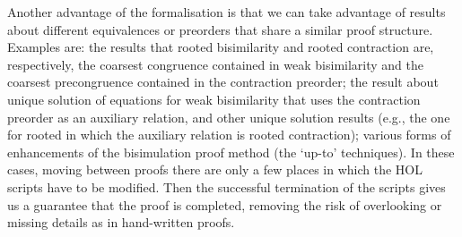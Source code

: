 
Another advantage of the formalisation is 
that we can take advantage of results about different 
equivalences or preorders that share a similar  proof structure. 
Examples are: the results that rooted bisimilarity and rooted contraction are,
respectively, the coarsest congruence contained in weak bisimilarity 
and the coarsest precongruence contained in the contraction  preorder; 
the result about unique solution of equations for weak bisimilarity that uses the
contraction preorder as an auxiliary relation, and other unique solution results (e.g., 
the one for rooted in which
the auxiliary relation is rooted contraction); various forms of enhancements of the bisimulation
proof method (the `up-to' techniques).
In these cases,  moving between proofs there are only a few places in
which the HOL scripts have to be modified.
Then the successful termination of the scripts  gives us a guarantee that the proof is
completed,  removing the risk 
of overlooking or missing details as in hand-written proofs.



